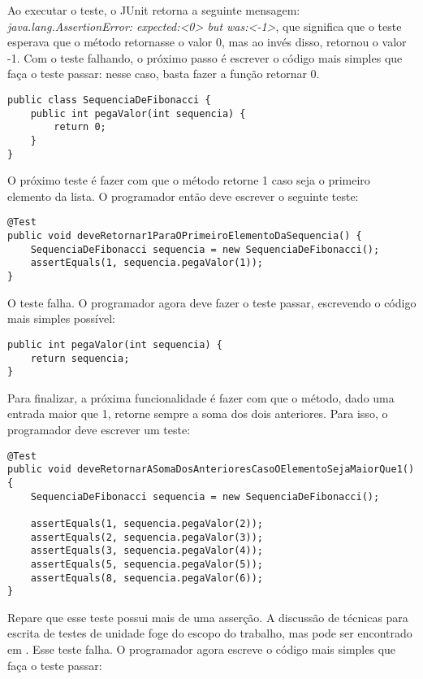 Ao executar o teste, o JUnit retorna a seguinte mensagem: \textit{java.lang.AssertionError: expected:<0> but was:<-1>}, que significa que
o teste esperava que o método retornasse o valor 0, mas ao invés disso, retornou o valor -1. Com o teste falhando, o próximo passo é escrever
o código mais simples que faça o teste passar: nesse caso, basta fazer a função retornar 0.

\begin{lstlisting}[frame=trbl]
public class SequenciaDeFibonacci {
	public int pegaValor(int sequencia) {
		return 0;
	}
}
\end{lstlisting}

O próximo teste é fazer com que o método retorne 1 caso seja o primeiro elemento da lista. O programador então deve escrever o
seguinte teste:

\begin{lstlisting}[frame=trbl]
@Test
public void deveRetornar1ParaOPrimeiroElementoDaSequencia() {
	SequenciaDeFibonacci sequencia = new SequenciaDeFibonacci();
	assertEquals(1, sequencia.pegaValor(1));		
}
\end{lstlisting}

O teste falha. O programador agora deve fazer o teste passar, escrevendo o código mais simples possível:

\begin{lstlisting}[frame=trbl]
public int pegaValor(int sequencia) {
	return sequencia;
}
\end{lstlisting}

Para finalizar, a próxima funcionalidade é fazer com que o método, dado uma entrada maior que 1, retorne sempre a soma dos dois anteriores.
Para isso, o programador deve escrever um teste:

\begin{lstlisting}[frame=trbl]
@Test
public void deveRetornarASomaDosAnterioresCasoOElementoSejaMaiorQue1() {
	SequenciaDeFibonacci sequencia = new SequenciaDeFibonacci();

	assertEquals(1, sequencia.pegaValor(2));
	assertEquals(2, sequencia.pegaValor(3));	
	assertEquals(3, sequencia.pegaValor(4));
	assertEquals(5, sequencia.pegaValor(5));
	assertEquals(8, sequencia.pegaValor(6));
}
\end{lstlisting}

Repare que esse teste possui mais de uma asserção. A discussão de técnicas para escrita de testes de unidade foge do escopo do trabalho,
mas pode ser encontrado em \cite{xunit}. Esse teste falha. O programador agora escreve o código mais simples que faça o teste passar:

